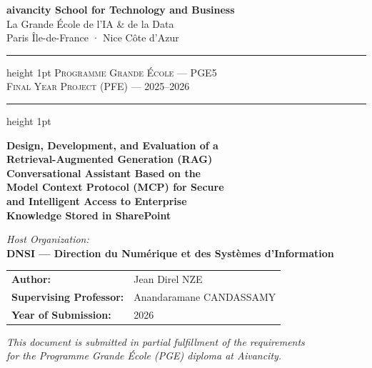 \begin{titlepage}
\thispagestyle{empty}

\begin{center}

{\large \textbf{aivancity School for Technology and Business}}\\[0.2cm]
{\normalsize La Grande École de l'IA \& de la Data}\\[0.1cm]
{\small Paris Île-de-France · Nice Côte d'Azur}\\[1.5cm]

\hrule height 1pt
\vspace{0.3cm}
{\small \textsc{Programme Grande École — PGE5}}\\
{\small \textsc{Final Year Project (PFE) — 2025–2026}}
\vspace{0.3cm}
\hrule height 1pt

\vspace{2cm}

{\LARGE \textbf{Design, Development, and Evaluation of a}}\\[0.4cm]
{\LARGE \textbf{Retrieval-Augmented Generation (RAG)}}\\[0.4cm]
{\LARGE \textbf{Conversational Assistant Based on the}}\\[0.4cm]
{\LARGE \textbf{Model Context Protocol (MCP) for Secure}}\\[0.4cm]
{\LARGE \textbf{and Intelligent Access to Enterprise}}\\[0.4cm]
{\LARGE \textbf{Knowledge Stored in SharePoint}}

\vspace{2cm}

{\normalsize \textit{Host Organization:}}\\[0.2cm]
{\large \textbf{DNSI — Direction du Numérique et des Systèmes d'Information}}

\vspace{2cm}

\begin{tabular}{ll}
  \textbf{Author:}               & Jean Direl NZE \\[0.3cm]
  \textbf{Supervising Professor:} & Anandaramane CANDASSAMY \\[0.3cm]
  \textbf{Year of Submission:}    & 2026 \\
\end{tabular}

\vfill

{\small \textit{This document is submitted in partial fulfillment of the requirements}}\\
{\small \textit{for the Programme Grande École (PGE) diploma at Aivancity.}}

\end{center}
\end{titlepage}
\cleardoublepage
